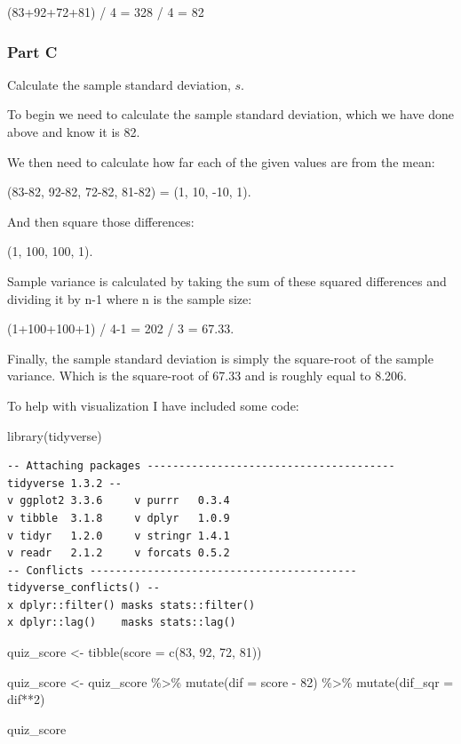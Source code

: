 \documentclass[
  letterpaper,
  DIV=11,
  numbers=noendperiod]{scrartcl}
\newenvironment{Shaded}{\begin{snugshade}}{\end{snugshade}}
\newcommand{\AttributeTok}[1]{\textcolor[rgb]{0.40,0.45,0.13}{#1}}
\newcommand{\DecValTok}[1]{\textcolor[rgb]{0.68,0.00,0.00}{#1}}
\newcommand{\FunctionTok}[1]{\textcolor[rgb]{0.28,0.35,0.67}{#1}}
\newcommand{\NormalTok}[1]{\textcolor[rgb]{0.00,0.23,0.31}{#1}}
\newcommand{\OtherTok}[1]{\textcolor[rgb]{0.00,0.23,0.31}{#1}}
\newcommand{\SpecialCharTok}[1]{\textcolor[rgb]{0.37,0.37,0.37}{#1}}
\begin{document}
(83+92+72+81) / 4 = 328 / 4 = 82

\hypertarget{part-c}{%
\subsubsection{Part C}\label{part-c}}

Calculate the sample standard deviation, \(s\).

To begin we need to calculate the sample standard deviation, which we
have done above and know it is 82.

We then need to calculate how far each of the given values are from the
mean:

(83-82, 92-82, 72-82, 81-82) = (1, 10, -10, 1).

And then square those differences:

(1, 100, 100, 1).

Sample variance is calculated by taking the sum of these squared
differences and dividing it by n-1 where n is the sample size:

(1+100+100+1) / 4-1 = 202 / 3 = 67.33.

Finally, the sample standard deviation is simply the square-root of the
sample variance. Which is the square-root of 67.33 and is roughly equal
to 8.206.

To help with visualization I have included some code:

\begin{Shaded}
\begin{Highlighting}[]
\FunctionTok{library}\NormalTok{(tidyverse)}
\end{Highlighting}
\end{Shaded}

\begin{verbatim}
-- Attaching packages --------------------------------------- tidyverse 1.3.2 --
v ggplot2 3.3.6     v purrr   0.3.4
v tibble  3.1.8     v dplyr   1.0.9
v tidyr   1.2.0     v stringr 1.4.1
v readr   2.1.2     v forcats 0.5.2
-- Conflicts ------------------------------------------ tidyverse_conflicts() --
x dplyr::filter() masks stats::filter()
x dplyr::lag()    masks stats::lag()
\end{verbatim}

\begin{Shaded}
\begin{Highlighting}[]
\NormalTok{quiz\_score }\OtherTok{\textless{}{-}} \FunctionTok{tibble}\NormalTok{(}\AttributeTok{score =} \FunctionTok{c}\NormalTok{(}\DecValTok{83}\NormalTok{, }\DecValTok{92}\NormalTok{, }\DecValTok{72}\NormalTok{, }\DecValTok{81}\NormalTok{))}

\NormalTok{quiz\_score }\OtherTok{\textless{}{-}}\NormalTok{ quiz\_score }\SpecialCharTok{\%\textgreater{}\%} 
  \FunctionTok{mutate}\NormalTok{(}\AttributeTok{dif =}\NormalTok{ score }\SpecialCharTok{{-}} \DecValTok{82}\NormalTok{) }\SpecialCharTok{\%\textgreater{}\%} 
  \FunctionTok{mutate}\NormalTok{(}\AttributeTok{dif\_sqr =}\NormalTok{ dif}\SpecialCharTok{**}\DecValTok{2}\NormalTok{)}

\NormalTok{quiz\_score}
\end{Highlighting}
\end{Shaded}
\end{document}
